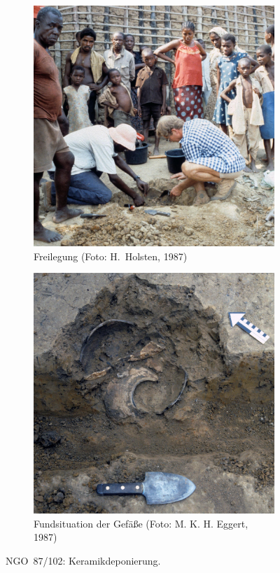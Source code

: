 \begin{figure}[tb]
	\centering
	\begin{subfigure}{\columnwidth}
		\centering
		\includegraphics[width=\textwidth]{fig/NGO87-102_HH87-II-18-5.jpg}
		\caption{Freilegung (Foto: H.~Holsten, 1987)}
		\label{fig:NGO87-102_A}
	\end{subfigure}\hfill
	\begin{subfigure}{\columnwidth}
		\centering
		\includegraphics[width=\textwidth]{fig/NGO87-102_E87-021-36.jpg}
		\caption{Fundsituation der Gefäße (Foto: M. K. H. Eggert, 1987)}
		\label{fig:NGO87-102_B}
	\end{subfigure}
	\caption{NGO~87/102: Keramikdeponierung.}
	\label{fig:NGO87-102}
\end{figure}

